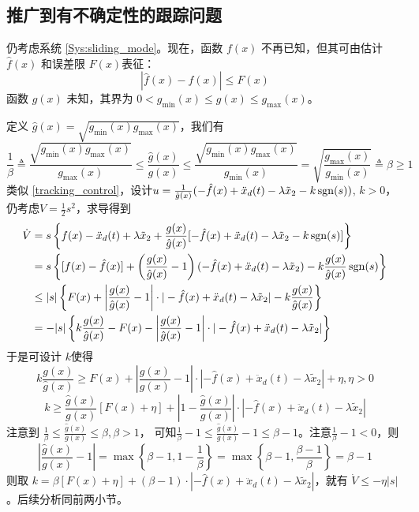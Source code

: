\subsection{推广到有不确定性的跟踪问题}\label{5C3ref}
仍考虑系统 \eqref{Sys:sliding_mode}。现在，函数 $f (x)$ 不再已知，但其可由估计$\hat{f} (x)$ 和误差限 $F (x)$表征：
\[ | \hat{f} (x) - f (x) | \leq F (x) \]
函数 $g (x)$ 未知，其界为 $0 < g_{\min} (x) \leq g (x) \leq g_{\max}(x)$。

定义 $\hat{g} (x) = \sqrt{g_{\min} (x) g_{\max} (x)}$，我们有
\[ \frac{1}{\beta} \triangleq \frac{\sqrt{g_{\min} (x) g_{\max}
   (x)}}{g_{\max} (x)} \leq \frac{\hat{g} (x)}{g (x)} \leq
   \frac{\sqrt{g_{\min} (x) g_{\max} (x)}}{g_{\min} (x)} =
   \sqrt{\frac{g_{\max} (x)}{g_{\min} (x)}} \triangleq \beta \geq 1 \]
类似 \eqref{tracking_control}，设计$u = \frac{1}{\hat{g} (x)} (- \hat{f} (x) + \ddot{x}_d (t) - \lambda
\tilde{x}_2 - k  \operatorname{sgn} (s))$, $k > 0$，仍考虑$V=\frac12 s^2$，求导得到
\begin{align*}
  \dot{V} & = s \left\{ f (x) - \ddot{x}_d (t) + \lambda \tilde{x}_2 +
  \frac{g (x)}{\hat{g} (x)} [- \hat{f} (x) + \ddot{x}_d (t) - \lambda
  \tilde{x}_2 - k  \operatorname{sgn} (s)] \right\}\\
  & = s \left\{ [f (x) - \hat{f} (x)] + \left( \frac{g (x)}{\hat{g} (x)} -
  1 \right) (- \hat{f} (x) + \ddot{x}_d (t) - \lambda \tilde{x}_2) - k \frac{g
  (x)}{\hat{g} (x)}  \operatorname{sgn} (s) \right\}\\
  & \leq | s | \left\{ F (x) + \left| \frac{g (x)}{\hat{g} (x)} - 1 \right|
  \cdot | - \hat{f} (x) + \ddot{x}_d (t) - \lambda \tilde{x}_2 | - k \frac{g
  (x)}{\hat{g} (x)} \right\}\\
  & = - | s | \left\{ k \frac{g (x)}{\hat{g} (x)} - F (x) - \left| \frac{g
  (x)}{\hat{g} (x)} - 1 \right| \cdot | - \hat{f} (x) + \ddot{x}_d (t) -
  \lambda \tilde{x}_2 | \right\}
\end{align*}
于是可设计 $k$使得
\[ k \frac{g (x)}{\hat{g} (x)} \geq F (x) + \left| \frac{g (x)}{\hat{g} (x)} -
   1 \right| \cdot | - \hat{f} (x) + \ddot{x}_d (t) - \lambda \tilde{x}_2 | +
   \eta, \eta > 0 \]
\[ k \geq \frac{\hat{g} (x)}{g (x)} [F (x) + \eta] + \left| 1 - \frac{\hat{g}
   (x)}{g (x)} \right| \cdot | - \hat{f} (x) + \ddot{x}_d (t) - \lambda
   \tilde{x}_2 | \]
注意到 $\frac{1}{\beta} \leq \frac{\hat{g} (x)}{g (x)} \leq \beta, \beta >1$，
可知$ \frac1\beta -1\le \frac{\hat{g}(x)}{g (x)}-1 \le\beta-1 $。注意$\frac1\beta -1<0$，则\[\left|  \frac{\hat{g}
   (x)}{g (x)}-1 \right|=\max\left\{\beta-1,1-\frac{1}{\beta}\right\}=\max\left\{\beta-1,\frac{\beta-1}{\beta}\right\}=\beta-1\]
则取 $k = \beta [F (x) + \eta] + (\beta - 1) \cdot | - \hat{f} (x) +\ddot{x}_d (t) - \lambda \tilde{x}_2 |$，就有 $\dot{V} \leq - \eta | s|$。后续分析同前两小节。
